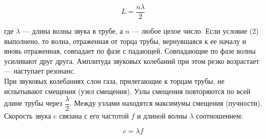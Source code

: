 \documentclass[12pt,a4paper]{article}
\begin{document}
	\begin{equation}
		L = \dfrac{n \lambda}{2}
	\end{equation}
	
	где $\lambda$ — длина волны звука в трубе, а $n$ — любое целое число. Если условие (2) выполнено, то волна, отраженная от торца трубы, вернувшаяся к ее началу и вновь отраженная, совпадает по фазе с падающей. Совпадающие по фазе волны усиливают друг друга. Амплитуда звуковых колебаний при этом резко возрастает — наступает резонанс.\\
	
	При звуковых колебаниях слои газа, прилегающие к торцам трубы, не испытывают смещения (узел смещения). Узлы смещения повторяются по всей длине трубы через $\dfrac{\lambda}{2}$. Между узлами находятся максимумы смещения (пучности).\\
	
	Скорость звука c связана с его частотой $f$ и длиной волны $\lambda$ соотношением:
	
	\begin{equation}
		c = \lambda f
	\end{equation}
	
\end{document}
